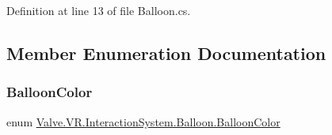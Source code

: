 Definition at line 13 of file Balloon.\+cs.



\subsection{Member Enumeration Documentation}
\mbox{\label{class_valve_1_1_v_r_1_1_interaction_system_1_1_balloon_afa934082ca64404919e75be87f823175}} 
\subsubsection{\texorpdfstring{BalloonColor}{BalloonColor}}
{\footnotesize\ttfamily enum \mbox{\hyperlink{class_valve_1_1_v_r_1_1_interaction_system_1_1_balloon_afa934082ca64404919e75be87f823175}{Valve.\+V\+R.\+Interaction\+System.\+Balloon.\+Balloon\+Color}}\hspace{0.3cm}{\ttfamily [strong]}}

